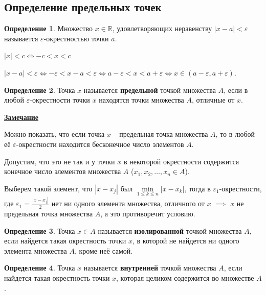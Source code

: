 \documentclass[a4paper,oneside]{article}
\theoremstyle{definition}
\newtheorem{definition}{Определение}[subsection]
\theoremstyle{definition}
\theoremstyle{definition}
\begin{document}
\subsection{Определение предельных точек}

\begin{definition}
    Множество $x \in \mathbb{R}$, удовлетворяющих неравенству $|x - a| < \varepsilon$
    называется $\varepsilon$-окрестностью точки $a$.
    
    $|x| < c \Leftrightarrow -c < x < c$
    
    $|x - a| < \varepsilon \Leftrightarrow -\varepsilon < x - a < \varepsilon \Leftrightarrow
    a - \varepsilon < x < a + \varepsilon \Leftrightarrow x \in (a - \varepsilon, a + \varepsilon)$.    
\end{definition}

\begin{definition}
    Точка $x$ называется \textbf{предельной} точкой множества $A$, если в любой $\varepsilon$-окрестности
    точки $x$ находятся точки множества $A$, отличные от $x$.        
\end{definition}

\underline{\textbf{Замечание}}

Можно показать, что если точка $x$ -- предельная точка множества $A$, то в любой её
$\varepsilon$-окрестности находится бесконечное число элементов $A$.

Допустим, что это не так и у точки $x$ в некоторой окрестности содержится конечное
число элементов множества $A$ ($x_1,x_2,\dots,x_n \in A$).

Выберем такой элемент, что $|x - x_j|$ был $\underset{1 \le k \le n}{\min} |x - x_k|$,
тогда в $\varepsilon_1$-окрестности, где $\varepsilon_1 = \frac{|x - x_j|}{2}$ нет ни
одного элемента множества, отличного от $x$ $\implies$ $x$ не предельная точка множества
$A$, а это противоречит условию.


\begin{definition}
    Точка $x \in A$ называется \textbf{изолированной} точкой множества $A$, если найдется такая
    окрестность точки $x$, в которой не найдется ни одного элемента множества $A$,
    кроме неё самой.        
\end{definition}

\begin{definition}
    Точка $x$ называется \textbf{внутренней} точкой множества $A$, если найдется такая
    окрестность точки $x$, которая целиком содержится во множестве $A$.
\end{definition}
\end{document}
